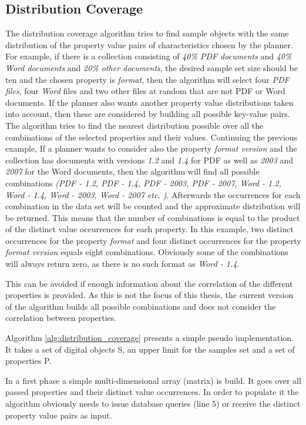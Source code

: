 \subsection{Distribution Coverage}
The distribution coverage algorithm tries to find sample objects with the same distribution of the property value pairs of characteristics chosen by the planner. For example, if there is a collection consisting of \textit{40\% PDF documents} and \textit{40\% Word documents} and \textit{20\% other documents}, the desired sample set size should be ten and the chosen property is \textit{format}, then the algorithm will select four \textit{PDF files}, four \textit{Word} files and two other files at random that are not PDF or Word documents.
If the planner also wants another property value distributions taken into account, then these are considered by building all possible key-value pairs. The algorithm tries to find the nearest distribution possible over all the combinations of the selected properties and their values.
Continuing the previous example, If a planner wants to consider also the property \textit{format version} and the collection has documents with versions \textit{1.2} and \textit{1.4} for PDF as well as \textit{2003} and \textit{2007} for the Word documents, then the algorithm will find all possible combinations \textit{(PDF - 1.2, PDF - 1.4, PDF - 2003, PDF - 2007, Word - 1.2, Word - 1.4, Word - 2003, Word - 2007 etc. )}. Afterwards the occurrences for each combination in the data set will be counted and the approximate distribution will be returned. This means that the number of combinations is equal to the product of the distinct value occurrences for each property. In this example, two distinct occurrences for the property \textit{format} and four distinct occurrences for the property \textit{format version} equals eight combinations. Obviously some of the combinations will always return zero, as there is no such format as \textit{Word - 1.4}. 

This can be avoided if enough information about the correlation of the different properties is provided. As this is not the focus of this thesis, the current version of the algorithm builds all possible combinations and does not consider the correlation between properties.

Algorithm \ref{alg:distribution_coverage} presents a simple pseudo implementation. It takes a set of digital objects S, an upper limit for the samples set and a set of properties P.

In a first phase a simple multi-dimensional array (matrix) is build. It goes over all passed properties and their distinct value occurrences. In order to populate it the algorithm obviously needs to issue database queries (line 5) or receive the distinct property value pairs as input.

